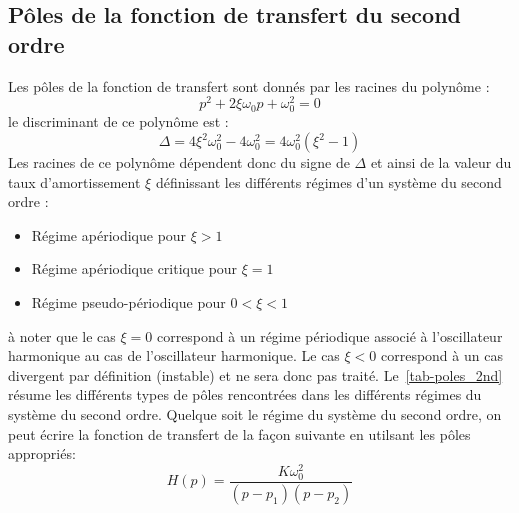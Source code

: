 \subsection*{Pôles de la fonction de transfert du second ordre}
Les pôles de la fonction de transfert sont donnés par les racines du polynôme :
\[
p^2+2\xi\omega_0p+\omega_0^2 = 0
\]
le discriminant de ce polynôme est :
\[
\Delta=4\xi^2\omega^2_0-4\omega_0^2=4\omega_0^2(\xi^2-1)
\]
Les racines de ce polynôme dépendent donc du signe de $\Delta$ 
et ainsi de la valeur du taux d'amortissement $\xi$ définissant les 
différents régimes d'un système du second ordre :
\begin{itemize}
    \item Régime apériodique pour $\xi>1$
    \item Régime apériodique critique pour $\xi=1$
    \item Régime pseudo-périodique pour $0<\xi<1$
\end{itemize}
à noter que le cas $\xi=0$ correspond à un régime périodique associé à 
l'oscillateur harmonique au cas de l'oscillateur harmonique.
Le cas $\xi<0$ correspond à un cas divergent par définition (instable) et 
ne sera donc pas traité.
Le~\cref{tab-poles_2nd} résume les différents types de pôles rencontrées dans 
les différents régimes du système du second ordre.
Quelque soit le régime du système du second ordre, on peut écrire la fonction 
de transfert de la façon suivante en utilsant les pôles appropriés:
\[
H(p)=\dfrac{K\omega^2_0}{(p-p_1)(p-p_2)}
\]
\newpage
\thispagestyle{empty}
